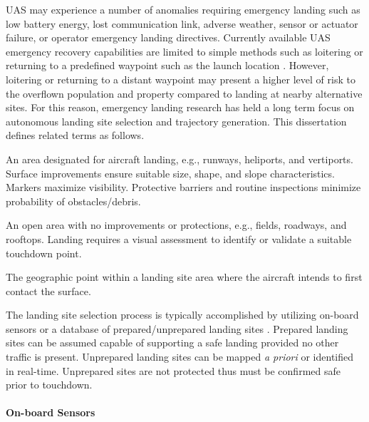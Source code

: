 \ac{UAS} may experience a number of anomalies requiring emergency landing such as low battery energy, lost communication link, adverse weather, sensor or actuator failure, or operator emergency landing directives. Currently available \ac{UAS} emergency recovery capabilities are limited to simple methods such as loitering or returning to a predefined waypoint such as the launch location \cite{Stansbury2015, mejias_alvarez_forced_2009}. However, loitering or returning to a distant waypoint may present a higher level of risk to the overflown population and property compared to landing at nearby alternative sites. For this reason, emergency landing research has held a long term focus on autonomous landing site selection and trajectory generation. This dissertation defines related terms as follows. 
\begin{definition}
An area designated for aircraft landing, e.g., runways, heliports, and vertiports. Surface improvements ensure suitable size, shape, and slope characteristics.  Markers maximize visibility. Protective barriers and routine inspections minimize probability of obstacles/debris.
\end{definition}
\begin{definition}
An open area with no improvements or protections, e.g., fields, roadways, and rooftops. Landing requires a visual assessment to identify or validate a suitable touchdown point.
\end{definition}
\begin{definition}
The geographic point within a landing site area where the aircraft intends to first contact the surface.
\end{definition}
The landing site selection process is typically accomplished by utilizing on-board sensors or a database of prepared/unprepared landing sites \cite{warren_enabling_2015, ten_harmsel_emergency_2017}.  Prepared landing sites can be assumed capable of supporting a safe landing provided no other traffic is present.  Unprepared landing sites can be mapped {\em a priori} or identified in real-time.  Unprepared sites are not protected thus must be confirmed safe prior to touchdown.
\paragraph{On-board Sensors}

